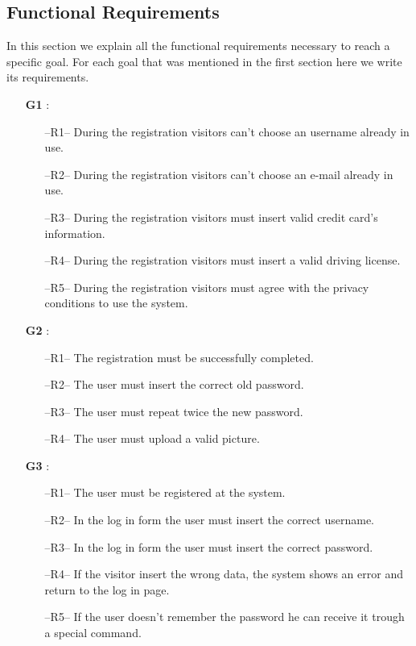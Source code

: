 \subsection{Functional Requirements} \label{sec:funct_requirements}
In this section we explain all the functional requirements necessary to reach a specific goal. For each goal that was mentioned in the first section here we write its requirements.
\begin{itemize}
\item[\textbf{G1}]: 
\begin{itemize}
\item[--R1--] During the registration visitors can't choose an username already in use.
\item[--R2--] During the registration visitors can't choose an e-mail already in use.
\item[--R3--] During the registration visitors must insert valid credit card's information.
\item[--R4--] During the registration visitors must insert a valid driving license.
\item[--R5--] During the registration visitors must agree with the privacy conditions to use the system.
\end{itemize}

\item[\textbf{G2}]:
\begin{itemize}
\item[--R1--] The registration must be successfully completed.
\item[--R2--] The user must insert the correct old password.
\item[--R3--] The user must repeat twice the new password.
\item[--R4--] The user must upload a valid picture.
\end{itemize}

\item[\textbf{G3}]:
\begin{itemize}
\item[--R1--] The user must be registered at the system.
\item[--R2--] In the log in form the user must insert the correct username.
\item[--R3--] In the log in form the user must insert the correct password.
\item[--R4--] If the visitor insert the wrong data, the system shows an error and return to the log in page.
\item[--R5--] If the user doesn't remember the password he can receive it trough a special command.
\end{itemize}


\end{itemize}
